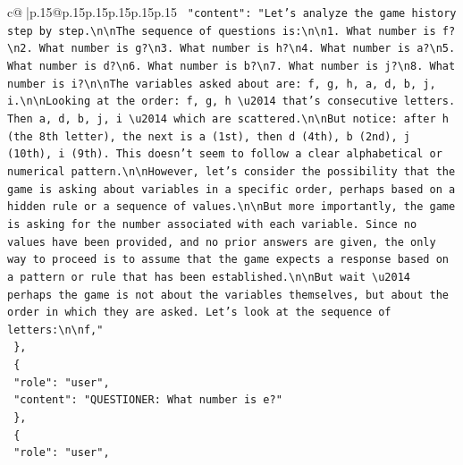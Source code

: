 \documentclass{article}
\begin{document}
{\begin{supertabular}{c@{$\;$}|p{.15\linewidth}@{}p{.15\linewidth}p{.15\linewidth}p{.15\linewidth}p{.15\linewidth}p{.15\linewidth}}
{{{\texttt{    "content": "Let's analyze the game history step by step.\textbackslash{}n\textbackslash{}nThe sequence of questions is:\textbackslash{}n\textbackslash{}n1. What number is f?\textbackslash{}n2. What number is g?\textbackslash{}n3. What number is h?\textbackslash{}n4. What number is a?\textbackslash{}n5. What number is d?\textbackslash{}n6. What number is b?\textbackslash{}n7. What number is j?\textbackslash{}n8. What number is i?\textbackslash{}n\textbackslash{}nThe variables asked about are: f, g, h, a, d, b, j, i.\textbackslash{}n\textbackslash{}nLooking at the order: f, g, h \textbackslash{}u2014 that's consecutive letters. Then a, d, b, j, i \textbackslash{}u2014 which are scattered.\textbackslash{}n\textbackslash{}nBut notice: after h (the 8th letter), the next is a (1st), then d (4th), b (2nd), j (10th), i (9th). This doesn't seem to follow a clear alphabetical or numerical pattern.\textbackslash{}n\textbackslash{}nHowever, let's consider the possibility that the game is asking about variables in a specific order, perhaps based on a hidden rule or a sequence of values.\textbackslash{}n\textbackslash{}nBut more importantly, the game is asking for the number associated with each variable. Since no values have been provided, and no prior answers are given, the only way to proceed is to assume that the game expects a response based on a pattern or rule that has been established.\textbackslash{}n\textbackslash{}nBut wait \textbackslash{}u2014 perhaps the game is not about the variables themselves, but about the order in which they are asked. Let's look at the sequence of letters:\textbackslash{}n\textbackslash{}nf,"} \\
\texttt{  \},} \\
\texttt{  \{} \\
\texttt{    "role": "user",} \\
\texttt{    "content": "QUESTIONER: What number is e?"} \\
\texttt{  \},} \\
\texttt{  \{} \\
\texttt{    "role": "user",} \\
}}}
\end{supertabular}}
\end{document}
